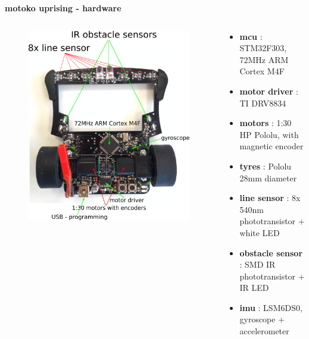 \documentclass[xcolor=dvipsnames]{beamer}
\begin{document}
\begin{frame}{\bf motoko uprising - hardware}

\begin{columns}

    \begin{column}{0.5\textwidth}

        \begin{figure}
            \includegraphics[scale=0.3]{../images/motoko_uprising_hw.png}
        \end{figure}

    \end{column}


    \begin{column}{0.5\textwidth}  %
    {\small
        \begin{itemize}
            \item {\bf mcu}  : STM32F303, 72MHz ARM Cortex M4F
            \item {\bf motor driver} : TI DRV8834
            \item {\bf motors} : 1:30 HP Pololu, with magnetic encoder
            \item {\bf tyres} : Pololu 28mm diameter
            \item {\bf line sensor} : 8x 540nm phototransistor + white LED
            \item {\bf obstacle sensor} : SMD IR phototransistor + IR LED
            \item {\bf imu} : LSM6DS0, gyroscope + accelerometer
        \end{itemize}
    }
    \end{column}

\end{columns}

\end{frame}
\end{document}
